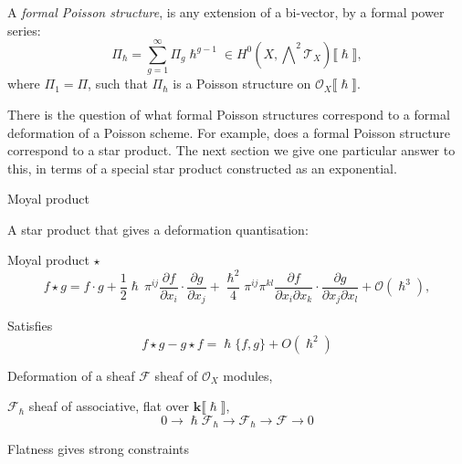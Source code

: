 \begin{frame}
    \begin{defn} 
    A \emph{formal Poisson structure}, is any extension of a {bi-vector}, by a formal power series:
    \[ \Pi_{\hslash} =  \sum_{g=1}^{\infty} \Pi_g \hslash^{g-1} \in H^0(X,\bigwedge\nolimits^{\!2} \mathcal{T}_X)\lBrack \hslash \rBrack , \]
    where \(\Pi_1 = \Pi\), such that 
    \( \Pi_{\hslash} \) is a Poisson structure on \( \mathcal{O}_X \lBrack \hslash \rBrack \).
    \end{defn}
\end{frame}



\begin{frame}
        There is the question of what formal Poisson structures correspond to a formal deformation of a Poisson scheme. For example, does a formal Poisson structure correspond to a star product. The next section we give one particular answer to this, in terms of a special star product constructed as an exponential.

\end{frame}


\begin{frame}{Moyal product}

A star product that gives a deformation quantisation:
\begin{defn}
    Moyal product \( \star\) 
    \[  f \star g = f \cdot g + \frac{1}{2} \hslash \, \pi^{ij} \frac{\partial f}{\partial x_i} \cdot  \frac{\partial g}{\partial x_j} + \frac{\hslash^2}{4} \pi^{ij} \pi^{kl}\frac{\partial f}{\partial x_i \partial x_k} \cdot \frac{\partial g}{\partial  x_j \partial x_l} + \mathcal{O}(\hslash^3),\] 
\end{defn}
    Satisfies
    \[ f \star g - g \star f = \hslash \{ f, g\} + O(\hslash^2)\]

\end{frame}

\begin{frame}{Deformation of a sheaf}
\( \mathcal{F} \) sheaf of \( \mathcal{O}_X\) modules, 
\begin{defn}
\( \mathcal{F}_{\hslash}\) sheaf of associative, flat over \( \mathbf{k}\lBrack \hslash \rBrack\), 
\[0 \rightarrow \hslash \mathcal{F}_{\hslash} \rightarrow \mathcal{F}_{\hslash} \rightarrow \mathcal{F} \rightarrow 0\]
\end{defn}
Flatness gives strong constraints
\end{frame}

